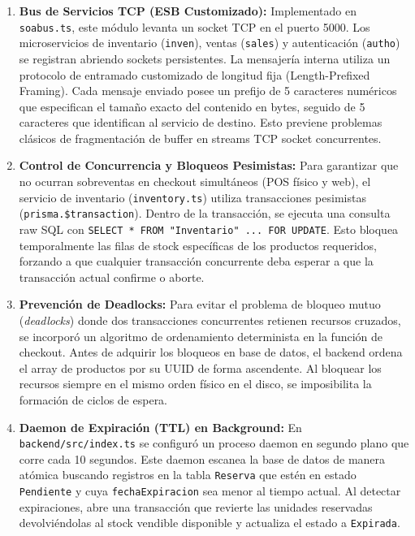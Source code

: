 \documentclass[12pt,a4paper]{article}
\begin{document}
\begin{enumerate}
    \item \textbf{Bus de Servicios TCP (ESB Customizado):}
    Implementado en \texttt{soabus.ts}, este módulo levanta un socket TCP en el puerto 5000. Los microservicios de inventario (\texttt{inven}), ventas (\texttt{sales}) y autenticación (\texttt{autho}) se registran abriendo sockets persistentes. La mensajería interna utiliza un protocolo de entramado customizado de longitud fija (Length-Prefixed Framing). Cada mensaje enviado posee un prefijo de 5 caracteres numéricos que especifican el tamaño exacto del contenido en bytes, seguido de 5 caracteres que identifican al servicio de destino. Esto previene problemas clásicos de fragmentación de buffer en streams TCP socket concurrentes.
    
    \item \textbf{Control de Concurrencia y Bloqueos Pesimistas:}
    Para garantizar que no ocurran sobreventas en checkout simultáneos (POS físico y web), el servicio de inventario (\texttt{inventory.ts}) utiliza transacciones pesimistas (\texttt{prisma.\$transaction}). Dentro de la transacción, se ejecuta una consulta raw SQL con \texttt{SELECT * FROM "Inventario" ... FOR UPDATE}. Esto bloquea temporalmente las filas de stock específicas de los productos requeridos, forzando a que cualquier transacción concurrente deba esperar a que la transacción actual confirme o aborte.
    
    \item \textbf{Prevención de Deadlocks:}
    Para evitar el problema de bloqueo mutuo (\textit{deadlocks}) donde dos transacciones concurrentes retienen recursos cruzados, se incorporó un algoritmo de ordenamiento determinista en la función de checkout. Antes de adquirir los bloqueos en base de datos, el backend ordena el array de productos por su UUID de forma ascendente. Al bloquear los recursos siempre en el mismo orden físico en el disco, se imposibilita la formación de ciclos de espera.
    
    \item \textbf{Daemon de Expiración (TTL) en Background:}
    En \texttt{backend/src/index.ts} se configuró un proceso daemon en segundo plano que corre cada 10 segundos. Este daemon escanea la base de datos de manera atómica buscando registros en la tabla \texttt{Reserva} que estén en estado \texttt{Pendiente} y cuya \texttt{fechaExpiracion} sea menor al tiempo actual. Al detectar expiraciones, abre una transacción que revierte las unidades reservadas devolviéndolas al stock vendible disponible y actualiza el estado a \texttt{Expirada}.
\end{enumerate}
\end{document}
